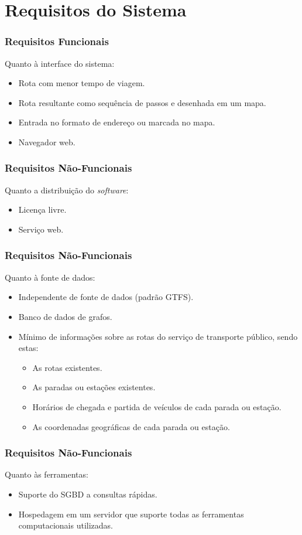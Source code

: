 \section{Requisitos do Sistema}

\frame
{
\frametitle{Requisitos Funcionais}
Quanto à interface do sistema:
\begin{itemize}
	\item Rota com menor tempo de viagem.
	\item Rota resultante como sequência de passos e desenhada em um mapa.
	\item Entrada no formato de endereço ou marcada no mapa.
	\item Navegador web.
\end{itemize}
}

\frame
{
\frametitle{Requisitos Não-Funcionais}
Quanto a distribuição do \emph{software}:
\begin{itemize}
	\item Licença livre.
	\item Serviço web.
\end{itemize}
}

\frame
{
\frametitle{Requisitos Não-Funcionais}
Quanto à fonte de dados:
\begin{itemize}
	\item Independente de fonte de dados (padrão GTFS).
	\item Banco de dados de grafos.
	\item Mínimo de informações sobre as rotas do serviço de transporte público, sendo estas:
	\begin{itemize}
		\item As rotas existentes.
		\item As paradas ou estações existentes.
		\item Horários de chegada e partida de veículos de cada parada ou estação.
		\item As coordenadas geográficas de cada parada ou estação.
	\end{itemize}
\end{itemize}
}

\frame
{
\frametitle{Requisitos Não-Funcionais}
Quanto às ferramentas:
\begin{itemize}
	\item Suporte do SGBD a consultas rápidas.
	\item Hospedagem em um servidor que suporte todas as ferramentas computacionais utilizadas.
\end{itemize}
}